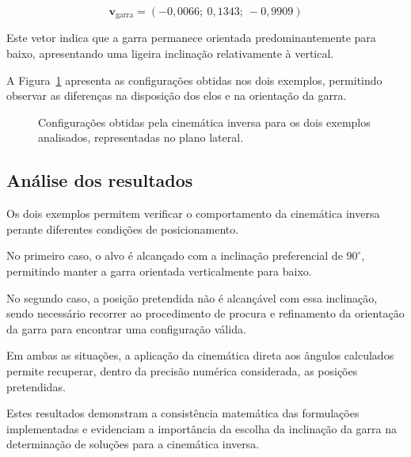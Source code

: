 \begin{equation}
    \mathbf{v}_{\mathrm{garra}}=
    (-0{,}0066;\ 0{,}1343;\ -0{,}9909)
\end{equation}

Este vetor indica que a garra permanece orientada predominantemente para baixo, apresentando uma ligeira inclinação relativamente à vertical.

A Figura~\ref{fig:exemplos_ik} apresenta as configurações obtidas nos dois exemplos, permitindo observar as diferenças na disposição dos elos e na orientação da garra.

\begin{figure}[H]
    \centering
    \resizebox{0.9\textwidth}{!}{
        
    }
    \caption{Configurações obtidas pela cinemática inversa para os dois exemplos analisados, representadas no plano lateral.}
    \label{fig:exemplos_ik}
\end{figure}

\subsection{Análise dos resultados}

Os dois exemplos permitem verificar o comportamento da cinemática inversa perante diferentes condições de posicionamento.

No primeiro caso, o alvo é alcançado com a inclinação preferencial de $90^\circ$, permitindo manter a garra orientada verticalmente para baixo.

No segundo caso, a posição pretendida não é alcançável com essa inclinação, sendo necessário recorrer ao procedimento de procura e refinamento da orientação da garra para encontrar uma configuração válida.

Em ambas as situações, a aplicação da cinemática direta aos ângulos calculados permite recuperar, dentro da precisão numérica considerada, as posições pretendidas.

Estes resultados demonstram a consistência matemática das formulações implementadas e evidenciam a importância da escolha da inclinação da garra na determinação de soluções para a cinemática inversa.

\clearpage
